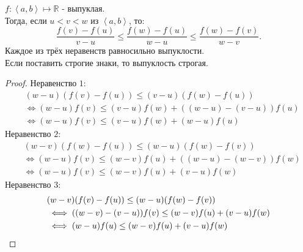 \documentclass[11pt, oneside]{article}   	%
\begin{document}
\begin{theorem}
    $f: \left<a, b\right> \mapsto \mathbb{R}$ - выпуклая.\\
    Тогда, если $u < v < w$ из $\left<a, b\right>$, то:
    \[ \frac{f(v)-f(u)}{v-u} \le \frac{f(w)-f(u)}{w-u} \le \frac{f(w)-f(v)}{w-v} .\]
    Каждое из трёх неравенств равносильно выпуклости.\\
    Если поставить строгие знаки, то выпуклость строгая.
    \begin{proof}
         Неравенство $1$:
         \begin{equation*}
             \begin{split}
                 &(w-u)(f(v)-f(u)) \le (v-u)(f(w)-f(u))\\
                 &\iff (w-u)f(v) \le (v-u)f(w) + ((w-u)-(v-u))f(u)\\
                 &\iff (w-u)f(v) \le (v-u)f(w) + (w-u)f(u)
             \end{split}
         \end{equation*}
         Неравенство $2$:
         \begin{equation*}
             \begin{split}
                 &(w-v)(f(w)-f(u)) \le (w-u)(f(w)-f(v))\\
                 &\iff (w-u)f(v) \le (w-v)f(u)+((w-u)-(w-v))f(w)\\
                 &\iff (w-u)f(v) \le (w-v)f(u) + (v-u)f(w)
             \end{split}
         \end{equation*}
         Неравенство $3$:
         \begin{equation*}
             \begin{split}
                 &(w-v)(f(v)-f(u)) \le (w-u)(f(w)-f(v))\\
                 &\iff ((w-v)-(v-u))f(v) \le (w-v)f(u) + (v-u)f(w)\\
                 &\iff (w-u)f(u) \le (w-v)f(u)+(v-u)f(w) \qedhere
             \end{split}
         \end{equation*}
    \end{proof}
\end{theorem}
\end{document}

